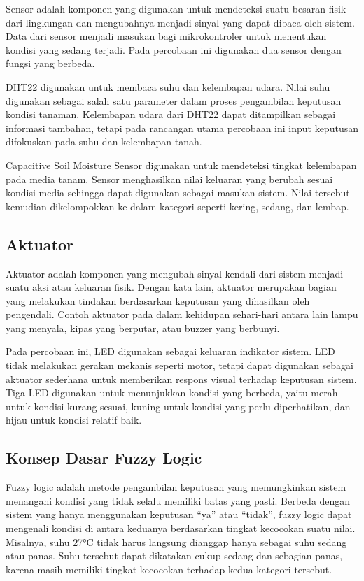 \documentclass[12pt,a4paper]{article}
\begin{document}
Sensor adalah komponen yang digunakan untuk mendeteksi suatu besaran fisik dari lingkungan dan mengubahnya menjadi sinyal yang dapat dibaca oleh sistem. Data dari sensor menjadi masukan bagi mikrokontroler untuk menentukan kondisi yang sedang terjadi. Pada percobaan ini digunakan dua sensor dengan fungsi yang berbeda.

DHT22 digunakan untuk membaca suhu dan kelembapan udara. Nilai suhu digunakan sebagai salah satu parameter dalam proses pengambilan keputusan kondisi tanaman. Kelembapan udara dari DHT22 dapat ditampilkan sebagai informasi tambahan, tetapi pada rancangan utama percobaan ini input keputusan difokuskan pada suhu dan kelembapan tanah.

Capacitive Soil Moisture Sensor digunakan untuk mendeteksi tingkat kelembapan pada media tanam. Sensor menghasilkan nilai keluaran yang berubah sesuai kondisi media sehingga dapat digunakan sebagai masukan sistem. Nilai tersebut kemudian dikelompokkan ke dalam kategori seperti kering, sedang, dan lembap.

\subsection{Aktuator}

Aktuator adalah komponen yang mengubah sinyal kendali dari sistem menjadi suatu aksi atau keluaran fisik. Dengan kata lain, aktuator merupakan bagian yang melakukan tindakan berdasarkan keputusan yang dihasilkan oleh pengendali. Contoh aktuator pada dalam kehidupan sehari-hari antara lain lampu yang menyala, kipas yang berputar, atau buzzer yang berbunyi.

Pada percobaan ini, LED digunakan sebagai keluaran indikator sistem. LED tidak melakukan gerakan mekanis seperti motor, tetapi dapat digunakan sebagai aktuator sederhana untuk memberikan respons visual terhadap keputusan sistem. Tiga LED digunakan untuk menunjukkan kondisi yang berbeda, yaitu merah untuk kondisi kurang sesuai, kuning untuk kondisi yang perlu diperhatikan, dan hijau untuk kondisi relatif baik.

\subsection{Konsep Dasar Fuzzy Logic}

Fuzzy logic adalah metode pengambilan keputusan yang memungkinkan sistem menangani kondisi yang tidak selalu memiliki batas yang pasti. Berbeda dengan sistem yang hanya menggunakan keputusan “ya” atau “tidak”, fuzzy logic dapat mengenali kondisi di antara keduanya berdasarkan tingkat kecocokan suatu nilai. Misalnya, suhu 27°C tidak harus langsung dianggap hanya sebagai suhu sedang atau panas. Suhu tersebut dapat dikatakan cukup sedang dan sebagian panas, karena masih memiliki tingkat kecocokan terhadap kedua kategori tersebut.
\end{document}
